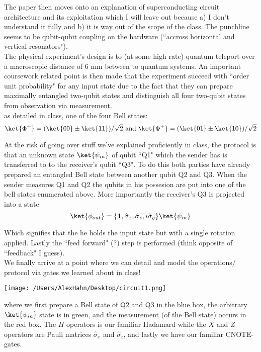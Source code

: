 The paper then moves onto an explanation of superconducting circuit
architecture and its exploitation which I will leave out because a) I don't
understand it fully and b) it is way out of the scope of the class. The
punchline seems to be qubit-qubit coupling on the hardware (``accross
horizontal and vertical resonators").\\

The physical experiment's design is to (at some high rate) quantum teleport over
a macroscopic distance of 6 mm between to quantum systems. An important
coursework related point is then made that the experiment succeed with
``order unit probability" for any input state due to the fact that they can
prepare maximally entangled two-qubit states and distinguish all four
two-qubit states from observation via measurement.\\

as detailed in class, one of the four Bell states:
$$\ket{\Phi^\pm}=(\ket{00}\pm\ket{11})/\sqrt{2}\text{ and }
\ket{\Phi^\pm}=(\ket{01}\pm\ket{10})/\sqrt{2}$$

At the risk of going over stuff we've explained proficiently in class, the
protocol is that an unknown state $\ket{\psi_{in}}$ of qubit ``Q1" which the sender has is transferred to to the
receiver's qubit ``Q3". To do this both parties have already prepared an
entangled Bell state between another qubit Q2 and Q3. When the sender
measures Q1 and Q2 the qubits in his possesion are put into one of the bell
states enumerated above. More importantly the receiver's Q3 is projected into
a state
$$\ket{\phi_{out}}=\{\textbf{1},\hat\sigma_x,\hat\sigma_z,i\hat\sigma_y\}\ket{\psi_{in}}$$

Which signifies that the he holds the input state but with a single
rotation applied. Lastly the ``feed forward" (?) step is performed (think
opposite of ``feedback" I guess).\\

We finally arrive at a point where we can detail and model the operations/ protocol via gates we
learned about in class!

\begin{center}
\texttt{[image: /Users/AlexHahn/Desktop/circuit1.png]}
\end{center}

where  we first prepare a Bell state of Q2 and Q3 in the blue box, the
arbitrary $\ket{\psi_{in}}$ state is in green, and the measurement (of the Bell
state) occurs in the red box. The $H$ operators is our familiar
Hadamard while the $X$ and $Z$ operators are Pauli matrices $\hat\sigma_x$ and
$\hat\sigma_z$, and lastly we have our familiar CNOTE-gates.\\

